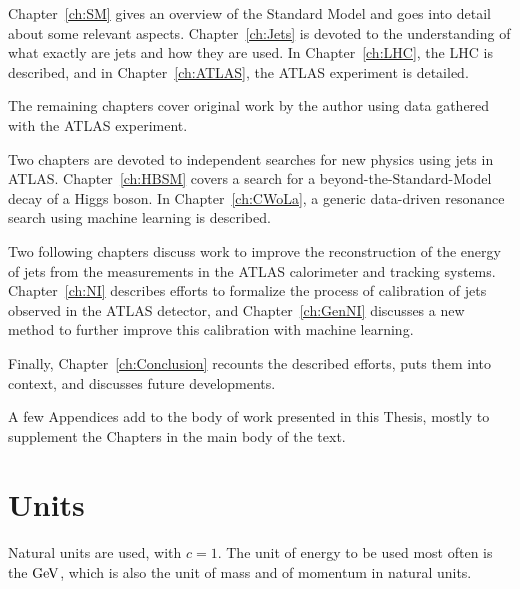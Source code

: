 Chapter~\ref{ch:SM} gives an overview of the Standard Model and goes into detail about some relevant aspects.
Chapter~\ref{ch:Jets} is devoted to the understanding of what exactly are jets and how they are used.
In Chapter~\ref{ch:LHC}, the LHC is described, and in Chapter~\ref{ch:ATLAS}, the ATLAS experiment is detailed.

The remaining chapters cover original work by the author using data gathered with the ATLAS experiment.

Two chapters are devoted to independent searches for new physics using jets in ATLAS.
Chapter~\ref{ch:HBSM} covers a search for a beyond-the-Standard-Model decay of a Higgs boson.
In Chapter~\ref{ch:CWoLa}, a generic data-driven resonance search using machine learning is described.

Two following chapters discuss work to improve the reconstruction of the energy of jets from the measurements in the ATLAS calorimeter and tracking systems.
Chapter~\ref{ch:NI} describes efforts to formalize the process of calibration of jets observed in the ATLAS detector, and Chapter~\ref{ch:GenNI} discusses a new method to further improve this calibration with machine learning.

Finally, Chapter~\ref{ch:Conclusion} recounts the described efforts, puts them into context, and discusses future developments.

A few Appendices add to the body of work presented in this Thesis, mostly to supplement the Chapters in the main body of the text.

\section{Units}
Natural units are used, with $c=1$.
The unit of energy to be used most often is the $\mathrm{GeV}$, which is also the unit of mass and of momentum in natural units.

